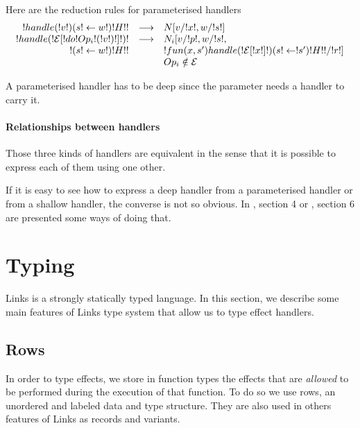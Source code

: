 \documentclass[11pt, nonacm=true, language=french, language=english]{acmart}
\begin{document}
Here are the reduction rules for parameterised handlers
\[
  \begin{array}{rcll}
    !handle ( !v! ) ( s!\leftarrow w! ) { !H! }! & \longrightarrow & N[v/!x!, w/!s!] \\
    !handle ( !\mathcal E[!do !Op_{i}!( !v! )!]! ) !  & \longrightarrow & N_{i}[v/!p!, w/!s!, \\
    ! ( s!\leftarrow w! ) { !H! }!                        &                 & !fun (x, s')  { handle ( !\mathcal E[!x!] ! ) ( s!\leftarrow!s' ) { !H! } }!/!r!] \\
                                                     &                 & Op_{i} \notin \mathcal E\\
  \end{array}
\]

\begin{rem}
  A parameterised handler has to be deep since the parameter needs a handler to carry it.
\end{rem}

\paragraph{Relationships between handlers}

Those three kinds of handlers are equivalent in the sense that it is possible to express each of them using one other.

If it is easy to see how to express a deep handler from a parameterised handler or from a shallow handler, the converse is not so obvious. In \citep{ehgc}, section 4 or \citep{daniel-thesis}, section 6 are presented some ways of doing that.

\section{Typing}
\label{sec:typing}

Links is a strongly statically typed language. In this section, we describe some main features of Links type system that allow us to type effect handlers.

\subsection{Rows}
\label{sec:row-typ}

In order to type effects, we store in function types the effects that are \emph{allowed} to be performed during the execution of that function. To do so we use rows, an unordered and labeled data and type structure. They are also used in others features of Links as records and variants.
\end{document}
